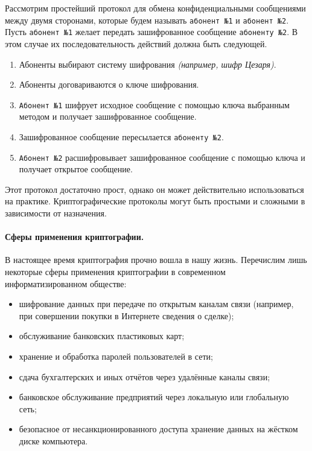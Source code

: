 Рассмотрим простейший протокол для обмена конфиденциальными сообщениями между
двумя сторонами, которые будем называть \texttt{абонент №1} и \texttt{абонент
№2}. Пусть \texttt{абонент №1} желает передать зашифрованное сообщение
\texttt{абоненту №2}. В этом случае их последовательность действий должна
быть следующей.
\begin{enumerate}
  \item Абоненты выбирают систему шифрования \emph{(например, шифр
      Цезаря)}.
  \item Абоненты договариваются о ключе шифрования.
  \item \texttt{Абонент №1} шифрует исходное сообщение с помощью ключа
      выбранным
      методом
      и получает зашифрованное сообщение.
  \item Зашифрованное сообщение пересылается \texttt{абоненту №2}.
  \item \texttt{Абонент №2} расшифровывает зашифрованное сообщение с помощью
      ключа и
      получает открытое сообщение.
\end{enumerate}
Этот протокол достаточно прост, однако он может действительно использоваться
на практике. Криптографические протоколы могут быть простыми и сложными в
зависимости от назначения.

\paragraph{Сферы применения криптографии.}%
В настоящее время криптография прочно вошла в нашу жизнь. Перечислим лишь
некоторые сферы применения криптографии в современном информатизированном
обществе:
\begin{itemize}
  \item шифрование данных при передаче по открытым каналам связи (например,
      при совершении покупки в Интернете сведения о сделке);
  \item обслуживание банковских пластиковых карт;
  \item хранение и обработка паролей пользователей в сети;
  \item сдача бухгалтерских и иных отчётов через удалённые каналы связи;
  \item банковское обслуживание предприятий через локальную или глобальную сеть;
  \item безопасное от несанкционированного доступа хранение данных на
      жёстком диске компьютера.
\end{itemize}

